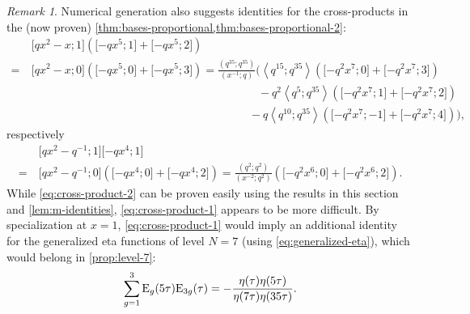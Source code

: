 \documentclass[reqno,11pt]{amsart}
\theoremstyle{definition}
\theoremstyle{remark}
\newtheorem*{remark}{Remark}
\numberwithin{equation}{section}
\newcommand{\E}{\textnormal E}
\newcommand{\la}{\left\langle}
\newcommand{\ra}{\right\rangle}
\newcommand{\vect}[2]{\big[{#1};{#2}\big]}
\begin{document}

\begin{remark}
Numerical generation also suggests identities for the cross-products in the (now proven) \cref{thm:bases-proportional,thm:bases-proportional-2}:
\begin{equation}\label{eq:cross-product-1}
\begin{aligned}
    &\vect{qx^2 - x}{1}\left(\vect{-qx^5}{1} + \vect{-qx^5}{2}\right)\\[-5pt]
    = \
    &\vect{qx^2 - x}{0}\left(\vect{-qx^5}{0} + \vect{-qx^5}{3}\right) 
    =  
    \frac{\left(q^{35}; q^{35}\right)}{\left(x^{-1}; q\right)} 
    \Big( 
    \la q^{15}; q^{35} \ra \left(\vect{-q^2 x^7}{0} + \vect{-q^2 x^7}{3}\right) 
    \\[-2pt]
    &\qquad\qquad\qquad\qquad\qquad \qquad\qquad\qquad\qquad\qquad
    -q^2\la q^5; q^{35} \ra \left(\vect{-q^2 x^7}{1} + \vect{-q^2 x^7}{2}\right)
    \\
    &\qquad\qquad\qquad\qquad\qquad \qquad\qquad\qquad\qquad\quad\ 
    -q\la q^{10}; q^{35} \ra \left(\vect{-q^2 x^7}{-1} + \vect{-q^2 x^7}{4}\right)
    \Big),
\end{aligned}
\end{equation}
respectively
\begin{equation} \label{eq:cross-product-2}
\begin{aligned}
    & \vect{qx^2 - q^{-1}}{1}\vect{-qx^4}{1} 
    \\[-5pt]
    = \
    &\vect{qx^2 - q^{-1}}{0}\left(\vect{-qx^4}{0} + \vect{-qx^4}{2}\right)
    =  
    \frac{\left(q^2; q^2\right)}{\left(x^{-2}; q^2\right)}
     \left(\vect{-q^2 x^6}{0} + \vect{-q^2 x^6}{2}\right).
\end{aligned}
\end{equation}
While \cref{eq:cross-product-2} can be proven easily using the results in this section and \cref{lem:m-identities}, \cref{eq:cross-product-1} appears to be more difficult. By specialization at $x = 1$, \cref{eq:cross-product-1} would imply an additional identity for the generalized eta functions of level $N = 7$ (using \cref{eq:generalized-eta}), which would belong in \cref{prop:level-7}:
\[
    \sum_{g = 1}^3  \E_g(5\tau) \E_{3g}(\tau) = 
    -
    \frac{\eta(\tau)\eta(5\tau)}{\eta(7\tau)\eta(35\tau)}.
\]
\end{remark}
\end{document}
